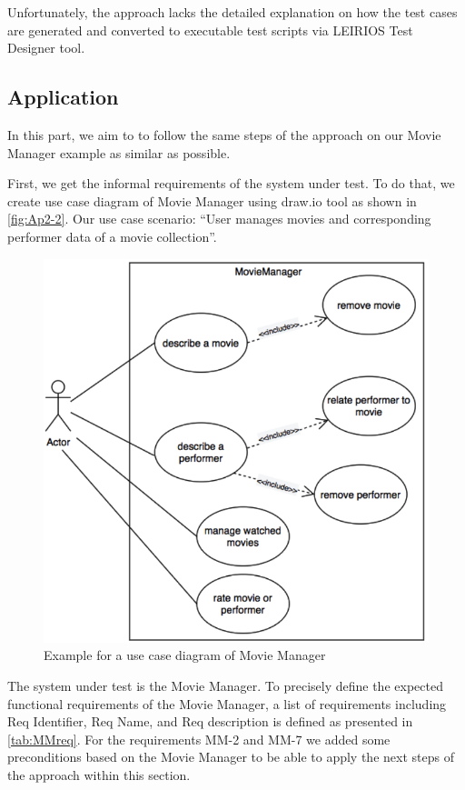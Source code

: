 Unfortunately, the approach lacks the detailed explanation on how the test cases are generated and converted to executable test scripts via LEIRIOS Test Designer tool.




\subsection{Application}

In this part, we aim to to follow the same steps of the approach on our Movie Manager example as similar as possible. 

First, we get the informal requirements of the system under test. To do that, we create use case diagram of Movie Manager using draw.io tool as shown in \autoref{fig:Ap2-2}. Our use case scenario: \enquote{User manages movies and corresponding performer data of a movie collection}.

\begin{figure} [H] 
\centering
\includegraphics[scale=0.35]{../images/Ap2-2} 
\caption{Example for a use case diagram of Movie Manager}
\label{fig:Ap2-2}
\end{figure}

The system under test is the Movie Manager. To precisely define the expected functional requirements of the Movie Manager, a list of requirements including Req Identifier, Req Name, and Req description is defined as presented in \autoref{tab:MMreq}. For the requirements MM-2 and MM-7 we added some preconditions based on the Movie Manager \cite{MovieManager} to be able to apply the next steps of the approach within this section. 

